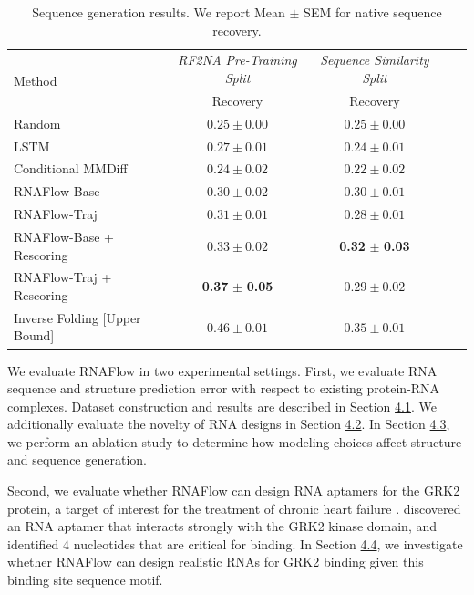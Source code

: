 \begin{table}[h]
    \centering
    \small
    \caption{Sequence generation results. We report Mean $\pm$ SEM for native sequence recovery.}
    \vspace{0.05in}
    \begin{tabular}{lcc@{\hskip 0.25in}cc}
        \hline
        \multirow{2}{*}{Method} &
        \multicolumn{1}{c}{\textit{RF2NA Pre-Training Split}} &
        \multicolumn{1}{c}{\textit{Sequence Similarity Split}} \\
        & Recovery  & Recovery \\ \hline
        Random & $0.25 \pm 0.00$ & $0.25 \pm 0.00$ \\
        LSTM & $0.27 \pm 0.01$ & $0.24 \pm 0.01$ \\
        Conditional MMDiff & $0.24 \pm 0.02$ & $0.22 \pm 0.02$ \\ \hline
        RNAFlow-Base & $0.30 \pm 0.02$ & $0.30 \pm 0.01$ \\ 
        RNAFlow-Traj & $0.31 \pm 0.01$ & $0.28 \pm 0.01$ \\ 
        RNAFlow-Base + Rescoring & $0.33 \pm 0.02$ & \textbf{0.32} $\pm$ \textbf{0.03} \\
        RNAFlow-Traj + Rescoring & \textbf{0.37} $\pm$ \textbf{0.05} & $0.29 \pm 0.02$ \\ \hline
        Inverse Folding [Upper Bound] & $0.46 \pm 0.01$ & $0.35 \pm 0.01$ \\ \hline
    \end{tabular}
    
    \label{tab:2}
\end{table}

We evaluate RNAFlow in two experimental settings. First, we evaluate RNA sequence and structure prediction error with respect to existing protein-RNA complexes. Dataset construction and results are described in Section \hyperref[sec:exp1]{4.1}. We additionally evaluate the novelty of RNA designs in Section \hyperref[sec:4.2]{4.2}. In Section \hyperref[sec:4.3]{4.3}, we perform an ablation study to determine how modeling choices affect structure and sequence generation.

Second, we evaluate whether RNAFlow can design RNA aptamers for the GRK2 protein, a target of interest for the treatment of chronic heart failure \cite{tesmer2012molecular}. \citet{mayer2008rna} discovered an RNA aptamer that interacts strongly with the GRK2 kinase domain, and \citet{lennarz2015rna} identified $4$ nucleotides that are critical for binding. In Section \hyperref[sec:4.4]{4.4}, we investigate whether RNAFlow can design realistic RNAs for GRK2 binding given this binding site sequence motif.

